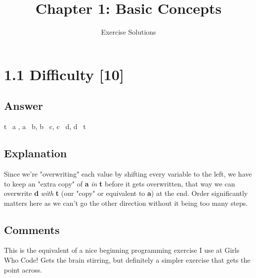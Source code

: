 \documentclass{article}
\title{Chapter 1: Basic Concepts}
\author{Exercise Solutions}
\date{}
\begin{document}
\maketitle

\section*{1.1 Difficulty [10]}

\subsection*{Answer}
t \textleftarrow\ a , a \textleftarrow\ b, b \textleftarrow\ c, 
c \textleftarrow\ d, d \textleftarrow\ t
\subsection*{Explanation}
Since we're "overwriting" each value by shifting every variable to the left, 
we have to keep an "extra copy" of \textbf{a} \textit{in} \textbf{t} before it gets overwritten, that way we can
overwrite \textbf{d} \textit{with} \textbf{t} (our "copy" or equivalent to \textbf{a}) at the end. Order significantly
matters here as we can't go the other direction without it being too many steps.
\subsection*{Comments}
This is the equivalent of a nice beginning programming exercise I use
at Girls Who Code! Gets the brain stirring, but definitely a simpler 
exercise that gets the point across.
\end{document}
